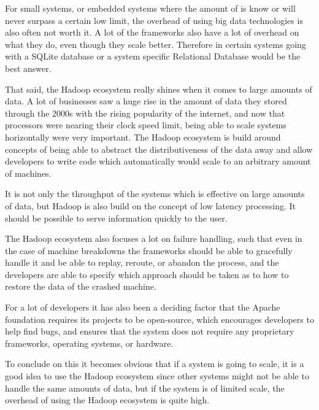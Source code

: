 \newpar For small systems, or embedded systems where the amount of is know or will never surpass a certain low limit, the overhead of using big data technologies is also often not worth it. A lot of the frameworks also have a lot of overhead on what they do, even though they scale better. Therefore in certain systems going with a SQLite database or a system specific Relational Database would be the best answer.

\newpar That said, the Hadoop ecosystem really shines when it comes to large amounts of data. A lot of businesses saw a huge rise in the amount of data they stored through the 2000s with the rising popularity of the internet, and now that processors were nearing their clock speed limit, being able to scale systems horizontally were very important. The Hadoop ecosystem is build around concepts of being able to abstract the distributiveness of the data away and allow developers to write code which automatically would scale to an arbitrary amount of machines. 

It is not only the throughput of the systems which is effective on large amounts of data, but Hadoop is also build on the concept of low latency processing. It should be possible to serve information quickly to the user.

\newpar The Hadoop ecosystem also focuses a lot on failure handling, such that even in the case of machine breakdowns the frameworks should be able to gracefully handle it and be able to replay, reroute, or abandon the process, and the developers are able to specify which approach should be taken as to how to restore the data of the crashed machine. 

\newpar For a lot of developers it has also been a deciding factor that the Apache foundation requires its projects to be open-source, which encourages developers to help find bugs, and ensures that the system does not require any proprietary frameworks, operating systems, or hardware.

\newpar To conclude on this it becomes obvious that if a system is going to scale, it is a good idea to use the Hadoop ecosystem since other systems might not be able to handle the same amounts of data, but if the system is of limited scale, the overhead of using the Hadoop ecosystem is quite high.
